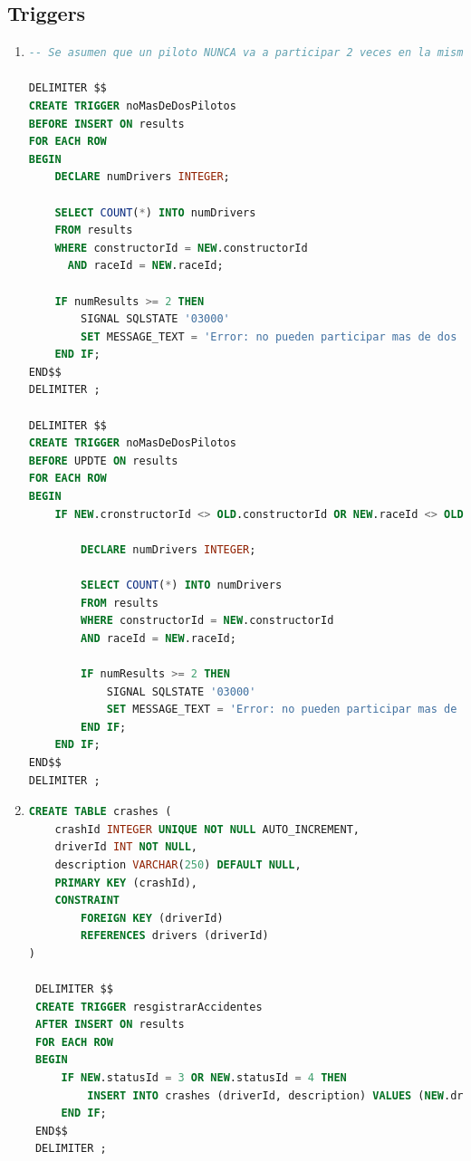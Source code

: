 \documentclass{db-practice}
\begin{document}
\subsection{Triggers}
\begin{enumerate}
\item
\begin{lstlisting}[language=SQL]
-- Se asumen que un piloto NUNCA va a participar 2 veces en la misma carrera

DELIMITER $$
CREATE TRIGGER noMasDeDosPilotos
BEFORE INSERT ON results
FOR EACH ROW
BEGIN
    DECLARE numDrivers INTEGER;
    
    SELECT COUNT(*) INTO numDrivers
    FROM results
    WHERE constructorId = NEW.constructorId
      AND raceId = NEW.raceId;
        
    IF numResults >= 2 THEN
        SIGNAL SQLSTATE '03000'
        SET MESSAGE_TEXT = 'Error: no pueden participar mas de dos pilotos por equipo';
    END IF;
END$$
DELIMITER ;

DELIMITER $$
CREATE TRIGGER noMasDeDosPilotos
BEFORE UPDTE ON results
FOR EACH ROW
BEGIN
    IF NEW.cronstructorId <> OLD.constructorId OR NEW.raceId <> OLD.raceId THEN

        DECLARE numDrivers INTEGER;
        
        SELECT COUNT(*) INTO numDrivers
        FROM results
        WHERE constructorId = NEW.constructorId
        AND raceId = NEW.raceId;
            
        IF numResults >= 2 THEN
            SIGNAL SQLSTATE '03000'
            SET MESSAGE_TEXT = 'Error: no pueden participar mas de dos pilotos por equipo';
        END IF;
    END IF;
END$$
DELIMITER ;
\end{lstlisting}

\item
\begin{lstlisting}[language=SQL]
CREATE TABLE crashes (
    crashId INTEGER UNIQUE NOT NULL AUTO_INCREMENT,
    driverId INT NOT NULL,
    description VARCHAR(250) DEFAULT NULL,
    PRIMARY KEY (crashId),
    CONSTRAINT
        FOREIGN KEY (driverId)
        REFERENCES drivers (driverId)
)
 
 DELIMITER $$
 CREATE TRIGGER resgistrarAccidentes
 AFTER INSERT ON results
 FOR EACH ROW
 BEGIN
     IF NEW.statusId = 3 OR NEW.statusId = 4 THEN
         INSERT INTO crashes (driverId, description) VALUES (NEW.driverId, 'blah blah blah');
     END IF;
 END$$
 DELIMITER ;
\end{lstlisting}


\end{enumerate}
\end{document}
